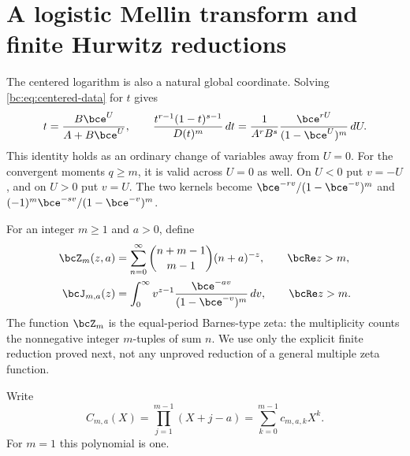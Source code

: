 \section{A logistic Mellin transform and finite Hurwitz reductions}
\label{bc:sec:mellin}

The centered logarithm is also a natural global coordinate. Solving
\eqref{bc:eq:centered-data} for $t$ gives
\begin{equation}\label{bc:eq:logistic}
 t=\frac{B\bce^U}{A+B\bce^U},\qquad
 \frac{t^{r-1}(1-t)^{s-1}}{D(t)^m}\,dt
   =\frac1{A^rB^s}\frac{\bce^{rU}}{(1-\bce^U)^m}\,dU.
\end{equation}
This identity holds as an ordinary change of variables away from $U=0$.
For the convergent moments $q\ge m$, it is valid across $U=0$ as well.
On $U<0$ put $v=-U$, and on $U>0$ put $v=U$. The two kernels become
$\bce^{-rv}/(1-\bce^{-v})^m$ and
$(-1)^m\bce^{-sv}/(1-\bce^{-v})^m$.

For an integer $m\ge1$ and $a>0$, define
\begin{align}
 \bcZ_m(z,a)&=\sum_{n=0}^\infty
       \binom{n+m-1}{m-1}(n+a)^{-z},\qquad \bcRe z>m,
                  \label{bc:eq:barnes-series}\\
 \bcJ_{m,a}(z)&=\int_0^\infty
       v^{z-1}\frac{\bce^{-av}}{(1-\bce^{-v})^m}\,dv,
                  \qquad \bcRe z>m.
                  \label{bc:eq:mellin-J}
\end{align}
The function $\bcZ_m$ is the equal-period Barnes-type zeta: the
multiplicity counts the nonnegative integer $m$-tuples of sum $n$.
We use only the explicit finite reduction proved next, not any
unproved reduction of a general multiple zeta function.

Write
\begin{equation}\label{bc:eq:c-polynomial}
 C_{m,a}(X)=\prod_{j=1}^{m-1}(X+j-a)
                  =\sum_{k=0}^{m-1}c_{m,a,k}X^k.
\end{equation}
For $m=1$ this polynomial is one.

